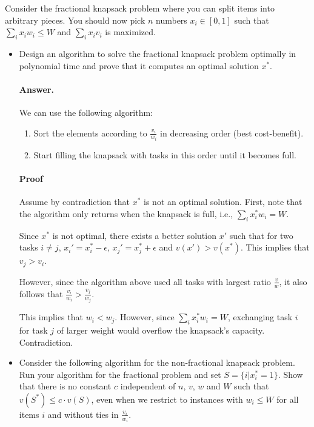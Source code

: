 \documentclass[a4paper]{article}
\begin{document}
Consider the fractional knapsack problem where you can split items into arbitrary pieces. You should now pick $n$ numbers $x_i \in [0, 1]$ such that $\sum_i x_i w_i \le W$ and $\sum_i x_i v_i$ is maximized.
\begin{itemize}
	\item Design an algorithm to solve the fractional knapsack problem optimally in polynomial time and prove that it computes an optimal solution $x^\ast$.
	
	\paragraph{Answer.} We can use the following algorithm:
	
	\begin{enumerate}
		\item Sort the elements according to $\frac{v_i}{w_i}$ in decreasing order (best cost-benefit).
		\item Start filling the knapsack with tasks in this order until it becomes full.
	\end{enumerate}
	
	\paragraph{Proof} Assume by contradiction that $x^\ast$ is not an optimal solution. First, note that the algorithm only returns when the knapsack is full, i.e., $\sum_i x_i^\ast w_i = W$.
	
	    Since $x^\ast$ is not optimal, there exists a better solution $x'$ such that for two tasks $i\neq j$, $x_i'=x_i^\ast - \epsilon$, $x_j' = x_j^\ast + \epsilon$ and $v(x') > v(x^\ast)$. This implies that $v_j > v_i$.
	    
	    However, since the algorithm above used all tasks with largest ratio $\frac{v}{w}$, it also follows that $\frac{v_i}{w_i} > \frac{v_j}{w_j}$.
	    
	    This implies that $w_i < w_j$. However, since $\sum_i x_i^\ast w_i = W$, exchanging task $i$ for task $j$ of larger weight would overflow the knapsack's capacity. Contradiction.
	
	\medskip
	
	\item Consider the following algorithm for the non-fractional knapsack problem. Run your algorithm for the fractional problem and set $S = \{i | x_i^{\ast} = 1\}$. Show that there is no constant $c$ independent of $n$, $v$, $w$ and $W$ such that $v(S^\ast) \le c \cdot v(S)$, even when we restrict to instances with $w_i \le W$ for all items $i$ and without ties in $\frac{v_i}{w_i}$.
	

\end{itemize}
\end{document}

